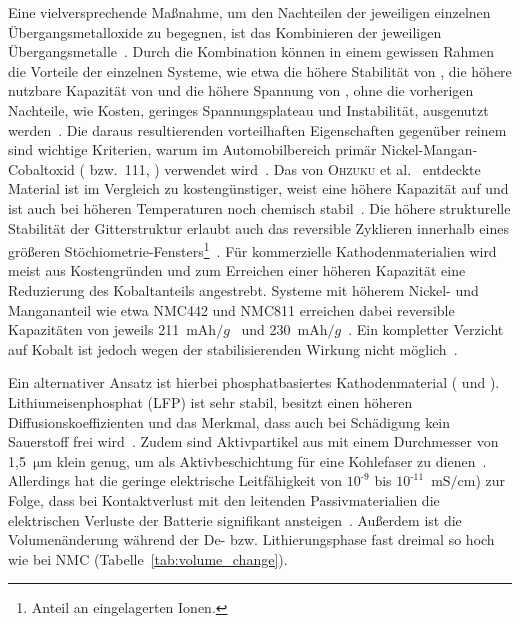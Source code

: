 Eine vielversprechende Maßnahme, um den Nachteilen der jeweiligen einzelnen Übergangsmetalloxide zu begegnen, ist das Kombinieren der jeweiligen Übergangsmetalle~\cite{Biasi2017}. Durch die Kombination können in einem gewissen Rahmen die Vorteile der einzelnen Systeme, wie etwa die höhere Stabilität von , die höhere nutzbare Kapazität von  und die höhere Spannung von , ohne die vorherigen Nachteile, wie Kosten, geringes Spannungsplateau und Instabilität, ausgenutzt werden~\cite{Ren2023}.
Die daraus resultierenden vorteilhaften Eigenschaften gegenüber reinem  sind wichtige Kriterien, warum im Automobilbereich primär Nickel-Mangan-Cobaltoxid ( bzw.\ 111, ) verwendet wird~\cite{Burow2016}. Das von \textsc{Ohzuku} et al.~\cite{Ohzuku2001, Yabuuchi2003} entdeckte Material ist im Vergleich zu  kostengünstiger, weist eine höhere Kapazität auf und ist auch bei höheren Temperaturen noch chemisch stabil~\cite{Kim2016,Zheng2012}. 
Die höhere strukturelle Stabilität der Gitterstruktur erlaubt auch das reversible Zyklieren innerhalb eines größeren Stöchiometrie-Fensters\footnote{Anteil an eingelagerten Ionen.}~\cite{Dolotko2014,Choi2005}. 
Für kommerzielle Kathodenmaterialien wird meist aus Kostengründen und zum Erreichen einer höheren Kapazität eine Reduzierung des Kobaltanteils angestrebt. Systeme mit höherem Nickel- und Mangananteil wie etwa NMC442 und NMC811 erreichen dabei reversible Kapazitäten von jeweils 211~$\si{\milli \ampere \hour \per g}$~\cite{Ma2014} und 230~$\si{\milli \ampere \hour \per g}$~\cite{Xue2021}. Ein kompletter Verzicht auf Kobalt ist jedoch wegen der stabilisierenden Wirkung nicht möglich~\cite{Ren2023}.

Ein alternativer Ansatz ist hierbei phosphatbasiertes Kathodenmaterial ( und ). Lithiumeisenphosphat (LFP) ist sehr stabil, besitzt einen höheren Diffusionskoeffizienten und das Merkmal, dass auch bei Schädigung kein Sauerstoff frei wird~\cite{Ling2021}. Zudem sind Aktivpartikel aus  mit einem Durchmesser von 1,5~$\si{\um}$ klein genug, um als Aktivbeschichtung für eine Kohlefaser zu dienen~\cite{Yuecel2023}.
Allerdings hat die geringe elektrische Leitfähigkeit von $10^{\text{-}9}$ bis $10^{\text{-}11}$~$\si{\milli \siemens \per \cm}$) zur Folge, dass bei Kontaktverlust mit den leitenden Passivmaterialien die elektrischen Verluste der Batterie signifikant ansteigen~\cite{Padhi1997}. Außerdem ist die Volumenänderung während der De- bzw. Lithierungsphase fast dreimal so hoch wie bei NMC (Tabelle~\ref{tab:volume_change}).

